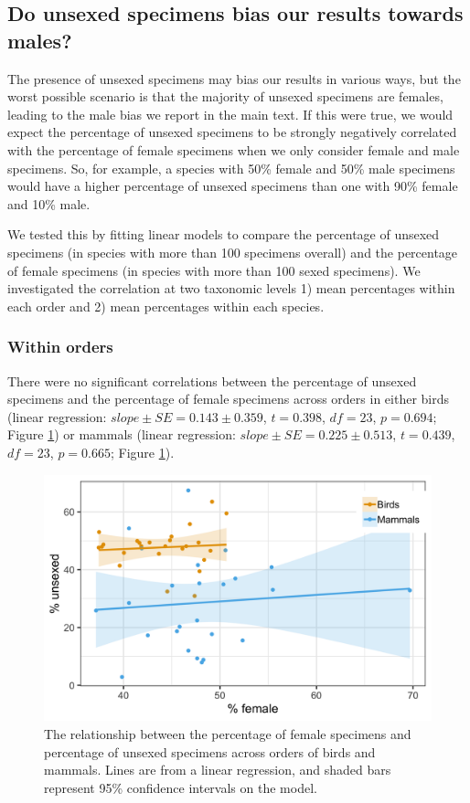 \documentclass[a4paper, 12pt]{article}
\begin{document}
\subsection*{Do unsexed specimens bias our results towards males?}

The presence of unsexed specimens may bias our results in various ways, but the worst possible scenario is that the majority of unsexed specimens are females, leading to the male bias we report in the main text. 
If this were true, we would expect the percentage of unsexed specimens to be strongly negatively correlated with the percentage of female specimens when we only consider female and male specimens. 
So, for example, a species with 50\% female and 50\% male specimens would have a higher percentage of unsexed specimens than one with 90\% female and 10\% male. 

We tested this by fitting linear models to compare the percentage of unsexed specimens (in species with more than 100 specimens overall) and the percentage of female specimens (in species with more than 100 sexed specimens). 
We investigated the correlation at two taxonomic levels 1) mean percentages within each order and 2) mean percentages within each species.

\subsubsection*{Within orders}
There were no significant correlations between the percentage of unsexed specimens and the percentage of female specimens across orders in either birds (linear regression: $slope ± SE = 0.143 \pm 0.359$, $t = 0.398$, $df = 23$, $p = 0.694$; Figure \ref{fig-nosex-correlation}) or mammals (linear regression: $slope \pm SE = 0.225 \pm 0.513$, $t = 0.439$, $df = 23$, $p = 0.665$; Figure \ref{fig-nosex-correlation}). 

\begin{figure}[H]
 \centering
  \includegraphics[width = \linewidth]{figures/nosex-correlation.png}
  \caption{The relationship between the percentage of female specimens and percentage of unsexed specimens across orders of birds and mammals. 
  Lines are from a linear regression, and shaded bars represent 95\% confidence intervals on the model.}
  \label{fig-nosex-correlation}
\end{figure}
\end{document}
